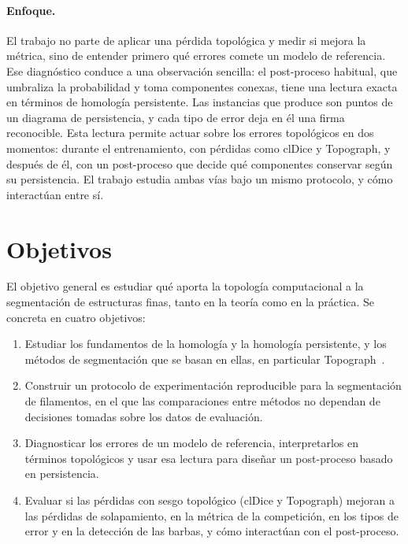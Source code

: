 \paragraph{Enfoque.} El trabajo no parte de aplicar una pérdida
topológica y medir si mejora la métrica, sino de entender primero qué
errores comete un modelo de referencia. Ese diagnóstico conduce a una
observación sencilla: el post-proceso habitual, que umbraliza la
probabilidad y toma componentes conexas, tiene una lectura exacta en
términos de homología persistente. Las instancias que produce son
puntos de un diagrama de persistencia, y cada tipo de error deja en él
una firma reconocible. Esta lectura permite actuar sobre los errores
topológicos en dos momentos: durante el entrenamiento, con pérdidas
como clDice y Topograph, y después de él, con un post-proceso que decide
qué componentes conservar según su persistencia. El trabajo estudia
ambas vías bajo un mismo protocolo, y cómo interactúan entre sí.

\section{Objetivos}

El objetivo general es estudiar qué aporta la topología computacional a
la segmentación de estructuras finas, tanto en la teoría como en la
práctica. Se concreta en cuatro objetivos:
\begin{enumerate}
  \item[\textbf{O1.}] Estudiar los fundamentos de la homología y la
  homología persistente, y los métodos de segmentación que se basan en
  ellas, en particular Topograph~\cite{lux2025}.
  \item[\textbf{O2.}] Construir un protocolo de experimentación
  reproducible para la segmentación de filamentos, en el que las
  comparaciones entre métodos no dependan de decisiones tomadas sobre
  los datos de evaluación.
  \item[\textbf{O3.}] Diagnosticar los errores de un modelo de
  referencia, interpretarlos en términos topológicos y usar esa lectura
  para diseñar un post-proceso basado en persistencia.
  \item[\textbf{O4.}] Evaluar si las pérdidas con sesgo topológico
  (clDice y Topograph) mejoran a las pérdidas de solapamiento, en la
  métrica de la competición, en los tipos de error y en la detección de
  las barbas, y cómo interactúan con el post-proceso.
\end{enumerate}

